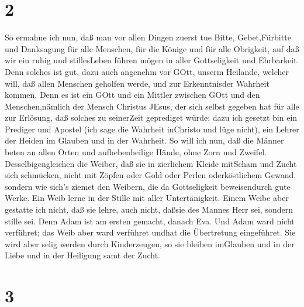 \hypertarget{section-1}{%
\section{2}\label{section-1}}

 So ermahne ich nun, daß man vor allen Dingen zuerst tue
Bitte, Gebet,Fürbitte und Danksagung für alle Menschen,  für
die Könige und für alle Obrigkeit, auf daß wir ein ruhig und
stillesLeben führen mögen in aller Gottseligkeit und Ehrbarkeit.
 Denn solches ist gut, dazu auch angenehm vor GOtt, unserm
Heilande,  welcher will, daß allen Menschen geholfen werde,
und zur Erkenntnisder Wahrheit kommen.  Denn es ist ein GOtt
und ein Mittler zwischen GOtt und den Menschen,nämlich der Mensch
Christus JEsus,  der sich selbst gegeben hat für alle zur
Erlösung, daß solches zu seinerZeit geprediget würde;  dazu
ich gesetzt bin ein Prediger und Apostel (ich sage die Wahrheit
inChristo und lüge nicht), ein Lehrer der Heiden im Glauben und in der
Wahrheit.  So will ich nun, daß die Männer beten an allen
Orten und aufhebenheilige Hände, ohne Zorn und Zweifel. 
Desselbigengleichen die Weiber, daß sie in zierlichem Kleide mitScham
und Zucht sich schmücken, nicht mit Zöpfen oder Gold oder Perlen
oderköstlichem Gewand,  sondern wie sich's ziemet den
Weibern, die da Gottseligkeit beweisendurch gute Werke. 
Ein Weib lerne in der Stille mit aller Untertänigkeit. 
Einem Weibe aber gestatte ich nicht, daß sie lehre, auch nicht, daßsie
des Mannes Herr sei, sondern stille sei.  Denn Adam ist am
ersten gemacht, danach Eva.  Und Adam ward nicht verführet;
das Weib aber ward verführet undhat die Übertretung eingeführet.
 Sie wird aber selig werden durch Kinderzeugen, so sie
bleiben imGlauben und in der Liebe und in der Heiligung samt der Zucht.

\hypertarget{section-2}{%
\section{3}\label{section-2}}

